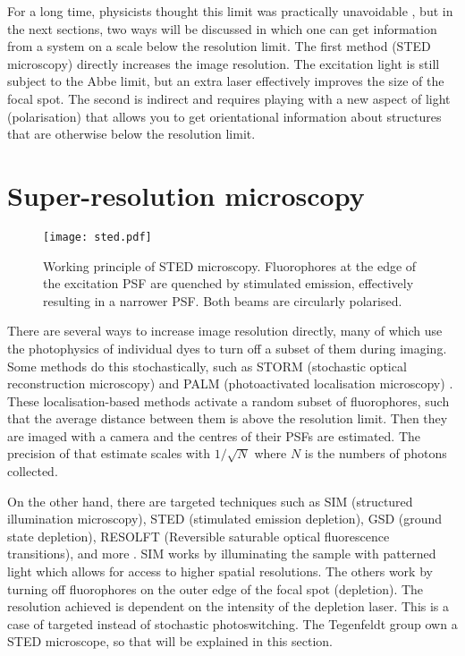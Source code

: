For a long time, physicists thought this limit was practically unavoidable \cite{McCutchen1967}, but in the next sections, two ways will be discussed in which one can get information from a system on a scale below the resolution limit. The first method (STED microscopy) directly increases the image resolution. The excitation light is still subject to the Abbe limit, but an extra laser effectively improves the size of the focal spot. The second is indirect and requires playing with a new aspect of light (polarisation) that allows you to get orientational information about structures that are otherwise below the resolution limit.

\section{Super-resolution microscopy}

\begin{figure}
	\centering
	\texttt{[image: sted.pdf]}
	\caption{
		Working principle of STED microscopy. Fluorophores at the edge of the excitation PSF are quenched by stimulated emission, effectively resulting in a narrower PSF. Both beams are circularly polarised. 
	}
	\label{fig:sted principle}
\end{figure}

There are several ways to increase image resolution directly, many of which use the photophysics of individual dyes to turn off a subset of them during imaging. Some methods do this stochastically, such as STORM (stochastic optical reconstruction microscopy) and PALM (photoactivated localisation microscopy) \cite{Mock2009, Betzig2006}. These localisation-based methods activate a random subset of fluorophores, such that the average distance between them is above the resolution limit. Then they are imaged with a camera and the centres of their PSFs are estimated. The precision of that estimate scales with $ 1/\sqrt{N} $ where $ N $ is the numbers of photons collected.

On the other hand, there are targeted techniques such as SIM (structured illumination microscopy), STED (stimulated emission depletion), GSD (ground state depletion), RESOLFT (Reversible saturable optical fluorescence transitions), and more \cite{Gustafsson2005, Folling2008, Hofmann2005}. SIM works by illuminating the sample with patterned light which allows for access to higher spatial resolutions. The others work by turning off fluorophores on the outer edge of the focal spot (depletion). The resolution achieved is dependent on the intensity of the depletion laser. This is a case of targeted instead of stochastic photoswitching. The Tegenfeldt group own a STED microscope, so that will be explained in this section. 

